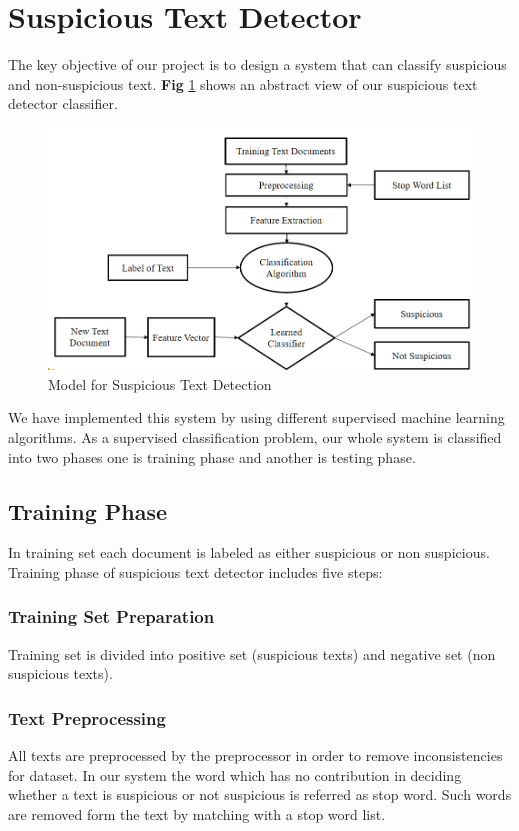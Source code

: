 \section{\textbf{Suspicious Text Detector}}
The key objective of our project is to design a system that can classify suspicious and non-suspicious text. \textbf{Fig} \ref{fig:proposed_model} shows an abstract view of our suspicious text detector classifier.

\begin{figure}[h!]
\centering
  \includegraphics[scale=0.365]{Figures/proposed_model.PNG}
  \caption{ Model for Suspicious Text Detection}
  \label{fig:proposed_model}
\end{figure}

We have implemented this system by using different supervised machine learning algorithms. As a supervised classification problem, our whole system is classified into two phases one is training phase and another is testing phase.
\subsection{\textbf {Training Phase}}
In training set each document is labeled as either suspicious or non suspicious. Training phase of suspicious text detector includes five steps:
\subsubsection{\textbf{Training Set Preparation}}
Training set is divided into positive set (suspicious texts) and negative set (non suspicious texts).
\subsubsection{\textbf{Text Preprocessing}}
All texts are preprocessed by the preprocessor in order to remove inconsistencies for dataset. In our system the word which has no contribution in deciding whether a text is suspicious or not suspicious is referred as stop word. Such words are removed form the text by matching with a stop word list. 
